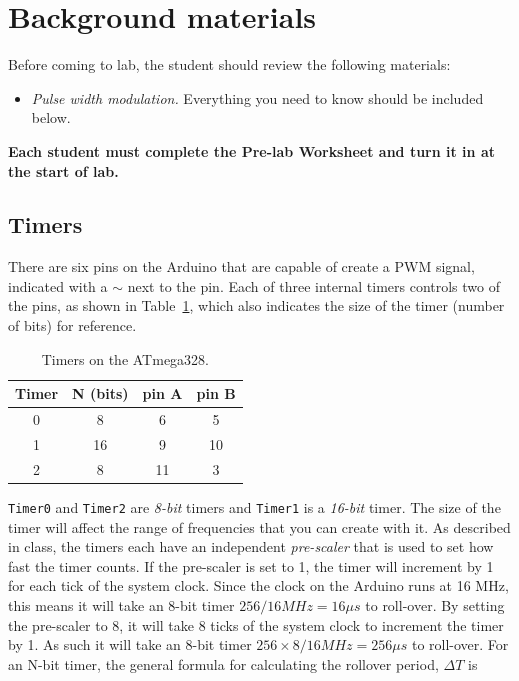 \documentclass[11pt]{article} %
\begin{document}
\section{Background materials}

Before coming to lab, the student should review the following materials:

\begin{itemize}
\item \emph{Pulse width modulation.} Everything you need to know should be included below.
\end{itemize}
{\bf Each student must complete the Pre-lab Worksheet and turn it in at the start of lab.}

\subsection{Timers}

There are six pins on the Arduino that are capable of create a PWM signal, indicated with a $\sim$ next to the pin. Each of three internal timers controls two of the pins, as shown in Table~\ref{tab:timers}, which also indicates the size of the timer (number of bits) for reference.

\begin{table}[h]
\centering
\begin{tabular}{c|c|c|c}
Timer & N (bits) & pin A & pin B \\
\hline\hline
0&8&6&5\\
\hline
1&16 &9&10\\
\hline
2&8&11&3\\
\hline
\end{tabular}
\caption{Timers on the ATmega328.}
\label{tab:timers}
\end{table}

\verb|Timer0| and \verb|Timer2| are \emph{8-bit} timers and \verb|Timer1| is a \emph{16-bit} timer. The size of the timer will affect the range of frequencies that you can create with it. As described in class, the timers each have an independent \emph{pre-scaler} that is used to set how fast the timer counts. If the pre-scaler is set to 1, the timer will increment by 1 for each tick of the system clock. Since the clock on the Arduino runs at 16 MHz, this means it will take an 8-bit timer $256 / 16 MHz = 16 \mu s$ to roll-over. By setting the pre-scaler to 8, it will take 8 ticks of the system clock to increment the timer by 1. As such it will take an 8-bit timer $256 \times 8 / 16 MHz = 256 \mu s$ to roll-over. For an N-bit timer, the general formula for calculating the rollover period, $\Delta T$ is
\end{document}
